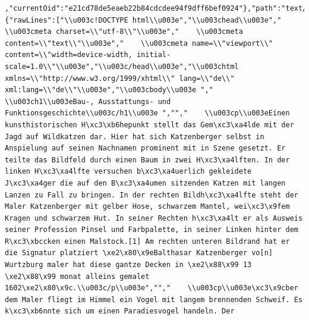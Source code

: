 \documentclass[
  letterpaper,
]{book}
\begin{document}
\begin{verbatim}
,"currentOid":"e21cd78de5eaeb22b84cdcdee94f9dff6bef0924"},"path":"text/wildkatzenjagd.html","currentUser":null,"blob":{"rawLines":["\\u003c!DOCTYPE html\\u003e","\\u003chead\\u003e","    \\u003cmeta charset=\\"utf-8\\"\\u003e","    \\u003cmeta content=\\"text\\"\\u003e","    \\u003cmeta name=\\"viewport\\" content=\\"width=device-width, initial-scale=1.0\\"\\u003e","\\u003c/head\\u003e","\\u003chtml xmlns=\\"http://www.w3.org/1999/xhtml\\" lang=\\"de\\" xml:lang=\\"de\\"\\u003e","\\u003cbody\\u003e ","    \\u003ch1\\u003eBau-, Ausstattungs- und Funktionsgeschichte\\u003c/h1\\u003e ","","    \\u003cp\\u003eEinen kunsthistorischen H\xc3\xb6hepunkt stellt das Gem\xc3\xa4lde mit der Jagd auf Wildkatzen dar. Hier hat sich Katzenberger selbst in Anspielung auf seinen Nachnamen prominent mit in Szene gesetzt. Er teilte das Bildfeld durch einen Baum in zwei H\xc3\xa4lften. In der linken H\xc3\xa4lfte versuchen b\xc3\xa4uerlich gekleidete J\xc3\xa4ger die auf den B\xc3\xa4umen sitzenden Katzen mit langen Lanzen zu Fall zu bringen. In der rechten Bildh\xc3\xa4lfte steht der Maler Katzenberger mit gelber Hose, schwarzem Mantel, wei\xc3\x9fem Kragen und schwarzem Hut. In seiner Rechten h\xc3\xa4lt er als Ausweis seiner Profession Pinsel und Farbpalette, in seiner Linken hinter dem R\xc3\xbccken einen Malstock.[1] Am rechten unteren Bildrand hat er die Signatur platziert \xe2\x80\x9eBalthasar Katzenberger vo[n] Wurtzburg maler hat diese gantze Decken in \xe2\x88\x99 13 \xe2\x88\x99 monat alleins gemalet 1602\xe2\x80\x9c.\\u003c/p\\u003e","","    \\u003cp\\u003e\xc3\x9cber dem Maler fliegt im Himmel ein Vogel mit langem brennenden Schweif. Es k\xc3\xb6nnte sich um einen Paradiesvogel handeln. Der 
\end{verbatim}
\end{document}
